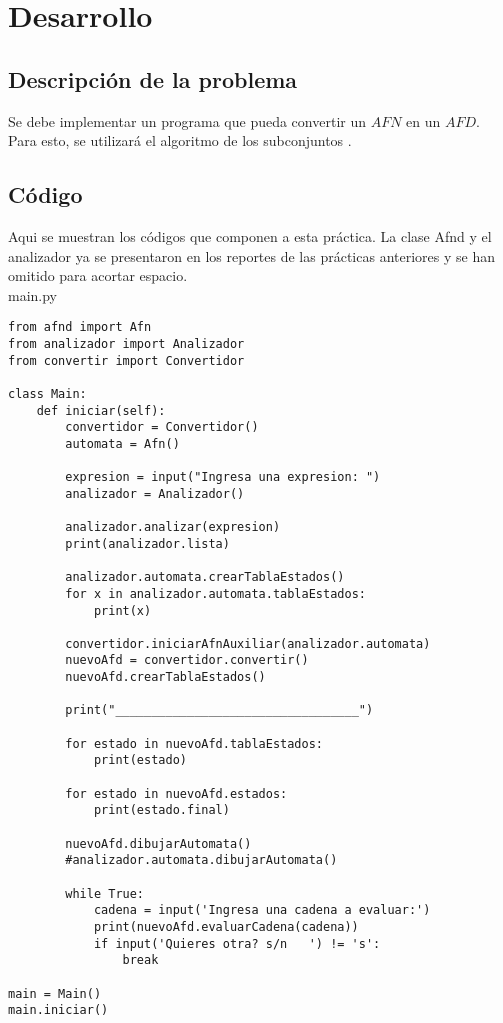 \section{Desarrollo}

\subsection{Descripción de la problema}

Se debe implementar un programa que pueda convertir un $AFN$ en un $AFD$. Para esto, se utilizará el algoritmo de los subconjuntos \cite{compiladores}.
\subsection{Código}

Aqui se muestran los códigos que componen a esta práctica. La clase Afnd y el analizador ya se presentaron en los reportes de las prácticas anteriores y se han omitido para acortar espacio. \\

main.py
\lstset{language=Python, breaklines=true, basicstyle=\footnotesize}
\begin{lstlisting}[frame=single]
from afnd import Afn
from analizador import Analizador
from convertir import Convertidor

class Main:
    def iniciar(self):
        convertidor = Convertidor()
        automata = Afn()

        expresion = input("Ingresa una expresion: ")
        analizador = Analizador()

        analizador.analizar(expresion)
        print(analizador.lista)

        analizador.automata.crearTablaEstados()
        for x in analizador.automata.tablaEstados:
            print(x)

        convertidor.iniciarAfnAuxiliar(analizador.automata)
        nuevoAfd = convertidor.convertir()
        nuevoAfd.crearTablaEstados()

        print("__________________________________")

        for estado in nuevoAfd.tablaEstados:
            print(estado)

        for estado in nuevoAfd.estados:
            print(estado.final)

        nuevoAfd.dibujarAutomata()
        #analizador.automata.dibujarAutomata()

        while True:
            cadena = input('Ingresa una cadena a evaluar:')
            print(nuevoAfd.evaluarCadena(cadena))
            if input('Quieres otra? s/n   ') != 's':
                break

main = Main()
main.iniciar()
\end{lstlisting}

